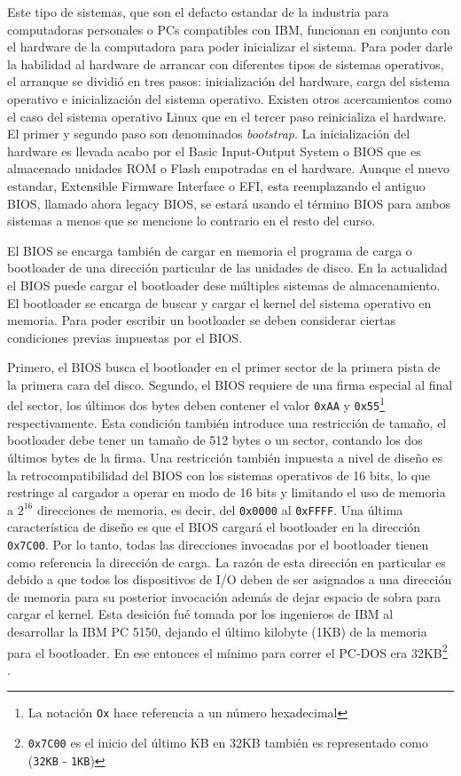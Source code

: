 Este tipo de sistemas, que son el defacto estandar de la industria para
computadoras personales o PCs compatibles con IBM, funcionan en conjunto con el
hardware de la computadora para poder inicializar el sistema. Para poder darle
la habilidad al hardware de arrancar con diferentes tipos de sistemas
operativos, el arranque se dividió en tres pasos: inicialización del hardware,
carga del sistema operativo e inicialización del sistema operativo. Existen
otros acercamientos como el caso del sistema operativo Linux que en el tercer
paso reinicializa el hardware. El primer y segundo paso son denominados
\emph{bootstrap}. La inicialización del hardware es llevada acabo por el Basic
Input-Output System o BIOS que es almacenado unidades ROM o Flash empotradas en
el hardware. Aunque el nuevo estandar, Extensible Firmware Interface o EFI,
esta reemplazando el antiguo BIOS, llamado ahora legacy BIOS, se estará usando
el término BIOS para ambos sistemas a menos que se mencione lo contrario en el
resto del curso.

El BIOS se encarga también de cargar en memoria el programa de carga o
bootloader de una dirección particular de las unidades de disco. En la
actualidad el BIOS puede cargar el bootloader dese múltiples sistemas de
almacenamiento. El bootloader se encarga de buscar y cargar el kernel del
sistema operativo en memoria.  Para poder escribir un bootloader se deben
considerar ciertas condiciones previas impuestas por el BIOS.

Primero, el BIOS busca el bootloader en el primer sector de la primera pista de
la primera cara del disco. Segundo, el BIOS requiere de una firma especial al
final del sector, los últimos dos bytes deben contener el valor \texttt{0xAA} y
\texttt{0x55}\footnote{La notación \texttt{Ox} hace referencia a un número
hexadecimal} respectivamente. Esta condición también introduce una restricción
de tamaño, el bootloader debe tener un tamaño de 512 bytes o un sector,
contando los dos últimos bytes de la firma. Una restricción también impuesta a
nivel de diseño es la retrocompatibilidad del BIOS con los sistemas operativos
de 16 bits, lo que restringe al cargador a operar en modo de 16 bits y
limitando el uso de memoria a $2^16$ direcciones de memoria, es decir, del
\texttt{0x0000} al \texttt{0xFFFF}. Una última característica de diseño es que
el BIOS cargará el bootloader en la dirección \texttt{0x7C00}. Por lo tanto,
todas las direcciones invocadas por el bootloader tienen como referencia la
dirección de carga. La razón de esta dirección en particular es debido a que
todos los dispositivos de I/O deben de ser asignados a una dirección de memoria
para su posterior invocación además de dejar espacio de sobra para cargar el
kernel. Esta desición fué tomada por los ingenieros de IBM al desarrollar la
IBM PC 5150, dejando el último kilobyte (1KB) de la memoria para el
bootloader. En ese entonces el mínimo para correr el PC-DOS era
32KB\footnote{\texttt{0x7C00} es el inicio del último KB en 32KB también es
representado como (\texttt{32KB} - \texttt{1KB})} .

